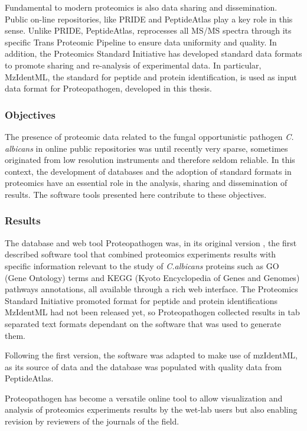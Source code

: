 Fundamental to modern proteomics is also data sharing and dissemination. 
Public on-line repositories, like PRIDE and PeptideAtlas play a key role in 
this sense. Unlike PRIDE, PeptideAtlas, reprocesses all MS/MS spectra through
its specific Trans Proteomic Pipeline to ensure data uniformity and quality.
In addition, the Proteomics Standard Initiative has developed standard data formats 
to promote sharing and re-analysis of experimental data. In particular,
MzIdentML, the standard for peptide and protein identification,
 is used as input data format for Proteopathogen, developed in this thesis.



\subsubsection*{Objectives}
The presence of proteomic data related to the fungal opportunistic 
pathogen \textit{C. albicans} in online public repositories was
until recently very sparse, sometimes originated from low resolution
instruments and therefore seldom reliable.
In this context, the development of databases and the adoption
of standard formats in proteomics have an essential role in the analysis,
sharing and dissemination of results. The software tools presented here 
contribute to these objectives.

\subsubsection*{Results}
The database and web tool Proteopathogen was, in its original version
\citep{Vialas2009b},
the first described software tool
that combined proteomics experiments results with specific information 
relevant to the study of \textit{C.albicans} proteins such as GO (Gene Ontology)
terms and KEGG (Kyoto Encyclopedia of Genes and Genomes) pathways annotations,
all available through a rich web interface.
The Proteomics Standard Initiative promoted format for peptide and protein
identifications MzIdentML had not been released yet, so Proteopathogen
collected results in tab separated text formats dependant on the software
that was used to generate them.

Following the first version, the software was adapted to make use of
mzIdentML, as its source of data
\citep{Vialas2015} and the database was populated with quality data from PeptideAtlas.

Proteopathogen has become a versatile online tool to allow
visualization and analysis of proteomics experiments results by the wet-lab 
users but also enabling revision by reviewers of the journals of the field.



